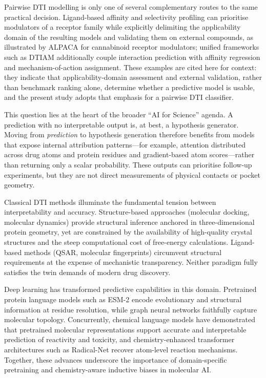 \documentclass[fleqn,10pt]{wlscirep}
\begin{document}
\begingroup\color{red}
Pairwise DTI modelling is only one of several complementary routes to the same
practical decision.  Ligand-based affinity and selectivity profiling can
prioritise modulators of a receptor family while explicitly delimiting the
applicability domain of the resulting models and validating them on external
compounds, as illustrated by ALPACA for cannabinoid receptor
modulators;\cite{delre2023alpaca} unified frameworks such as DTIAM additionally
couple interaction prediction with affinity regression and mechanism-of-action
assignment.\cite{lu2025dtiam}  These examples are cited here for context: they
indicate that applicability-domain assessment and external validation, rather
than benchmark ranking alone, determine whether a predictive model is usable,
and the present study adopts that emphasis for a pairwise DTI classifier.
\endgroup

This question lies at the heart of the broader ``AI for Science'' agenda.  A
prediction with no interpretable output is, at best, a hypothesis generator.
Moving from \emph{prediction} to hypothesis generation therefore benefits from
models that expose internal attribution patterns---for example, attention
distributed across drug atoms and protein residues and gradient-based atom
scores---rather than returning only a scalar probability.  These outputs can
prioritise follow-up experiments, but they are not direct measurements of
physical contacts or pocket geometry.

Classical DTI methods illuminate the fundamental tension between interpretability
and accuracy.  Structure-based approaches (molecular docking, molecular dynamics)
provide structural inference anchored in three-dimensional protein
geometry,\cite{kitchen2004docking} yet are constrained by the availability of
high-quality crystal structures and the steep computational cost of free-energy
calculations.  Ligand-based methods (QSAR, molecular
fingerprints)\cite{cherkasov2014qsar} circumvent structural requirements at
the expense of mechanistic transparency.  Neither paradigm fully satisfies the
twin demands of modern drug discovery.

Deep learning has transformed predictive capabilities in this domain.
Pretrained protein language models such as ESM-2\cite{lin2023evolutionary}
encode evolutionary and structural information at residue resolution, while
graph neural networks faithfully capture molecular topology.  Concurrently,
chemical language models have demonstrated that pretrained molecular
representations support accurate and interpretable prediction of reactivity and
toxicity,\cite{huang2025large} and chemistry-enhanced transformer
architectures such as Radical-Net recover atom-level reaction
mechanisms.\cite{huang2025radical}  Together, these advances underscore
the importance of domain-specific pretraining and chemistry-aware inductive
biases in molecular AI.\cite{huang2024ai}
\end{document}
